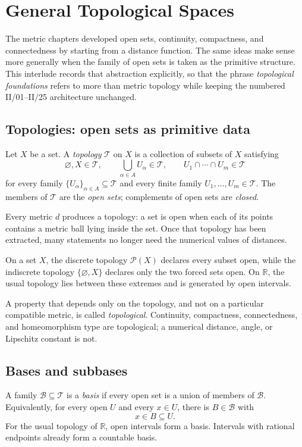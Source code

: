\chapter*{General Topological Spaces}
{}

The metric chapters developed open sets, continuity, compactness, and connectedness by starting from a distance function. The same ideas make sense more generally when the family of open sets is taken as the primitive structure. This interlude records that abstraction explicitly, so that the phrase \emph{topological foundations} refers to more than metric topology while keeping the numbered II/01--II/25 architecture unchanged.

\section{Topologies: open sets as primitive data}
Let \(X\) be a set. A \emph{topology} \(\mathcal T\) on \(X\) is a collection of subsets of \(X\) satisfying
\[
\varnothing,X\in\mathcal T,\qquad
\bigcup_{\alpha\in A}U_\alpha\in\mathcal T,
\qquad
U_1\cap\cdots\cap U_m\in\mathcal T
\]
for every family \(\{U_\alpha\}_{\alpha\in A}\subseteq\mathcal T\) and every finite family \(U_1,\dots,U_m\in\mathcal T\). The members of \(\mathcal T\) are the \emph{open sets}; complements of open sets are \emph{closed}.

Every metric \(d\) produces a topology: a set is open when each of its points contains a metric ball lying inside the set. Once that topology has been extracted, many statements no longer need the numerical values of distances.

\begin{example}
On a set \(X\), the discrete topology \(\mathcal P(X)\) declares every subset open, while the indiscrete topology \(\{\varnothing,X\}\) declares only the two forced sets open. On \(\mathbb R\), the usual topology lies between these extremes and is generated by open intervals.
\end{example}

A property that depends only on the topology, and not on a particular compatible metric, is called \emph{topological}. Continuity, compactness, connectedness, and homeomorphism type are topological; a numerical distance, angle, or Lipschitz constant is not.

\section{Bases and subbases}
A family \(\mathcal B\subseteq\mathcal T\) is a \emph{basis} if every open set is a union of members of \(\mathcal B\). Equivalently, for every open \(U\) and every \(x\in U\), there is \(B\in\mathcal B\) with
\[
x\in B\subseteq U.
\]
For the usual topology of \(\mathbb R\), open intervals form a basis. Intervals with rational endpoints already form a countable basis.


